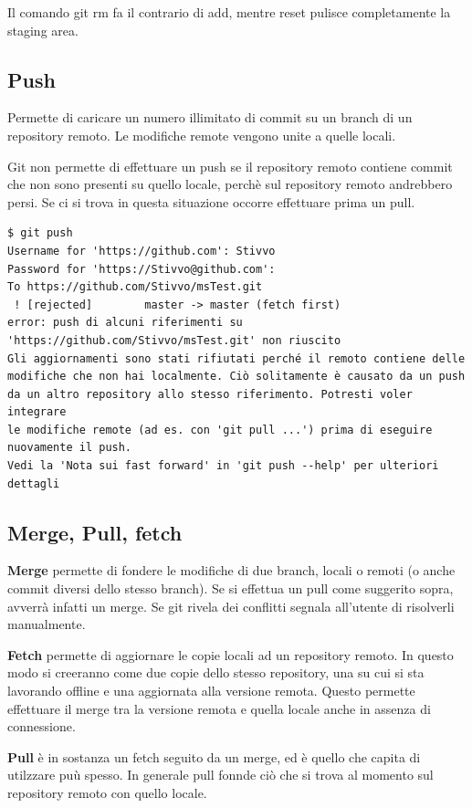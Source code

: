 \documentclass{article} \usepackage[textwidth=18cm,textheight=18cm]{geometry}
\begin{document}
Il comando git rm fa il contrario di add, mentre reset pulisce completamente la
staging area.

\subsection{Push}

Permette di caricare un numero illimitato di commit su un branch di un
repository remoto. Le modifiche remote vengono unite a quelle locali.

Git non permette di effettuare un push se il repository remoto contiene commit
che non sono presenti su quello locale, perchè sul repository remoto andrebbero
persi. Se ci si trova in questa situazione occorre effettuare prima un pull.

\begin{verbatim}
$ git push
Username for 'https://github.com': Stivvo
Password for 'https://Stivvo@github.com':
To https://github.com/Stivvo/msTest.git
 ! [rejected]        master -> master (fetch first)
error: push di alcuni riferimenti su 'https://github.com/Stivvo/msTest.git' non riuscito
Gli aggiornamenti sono stati rifiutati perché il remoto contiene delle
modifiche che non hai localmente. Ciò solitamente è causato da un push
da un altro repository allo stesso riferimento. Potresti voler integrare
le modifiche remote (ad es. con 'git pull ...') prima di eseguire
nuovamente il push.
Vedi la 'Nota sui fast forward' in 'git push --help' per ulteriori
dettagli
\end{verbatim}

\subsection{Merge, Pull, fetch}

\textbf{Merge} permette di fondere le modifiche di due branch, locali o remoti (o anche
commit diversi dello stesso branch). Se si effettua un pull come suggerito
sopra, avverrà infatti un merge. Se git rivela dei conflitti segnala all'utente
di risolverli manualmente. 

\textbf{Fetch} permette di aggiornare le copie locali ad un repository remoto. In questo
modo si creeranno come due copie dello stesso repository, una su cui si sta
lavorando offline e una aggiornata alla versione remota. Questo permette
effettuare il merge tra la versione remota e quella locale anche in assenza di
connessione.

\textbf{Pull} è in sostanza un fetch seguito da un merge, ed è quello che capita di
utilzzare puù spesso. In generale pull fonnde ciò che si trova al momento sul
repository remoto con quello locale.
\end{document}
